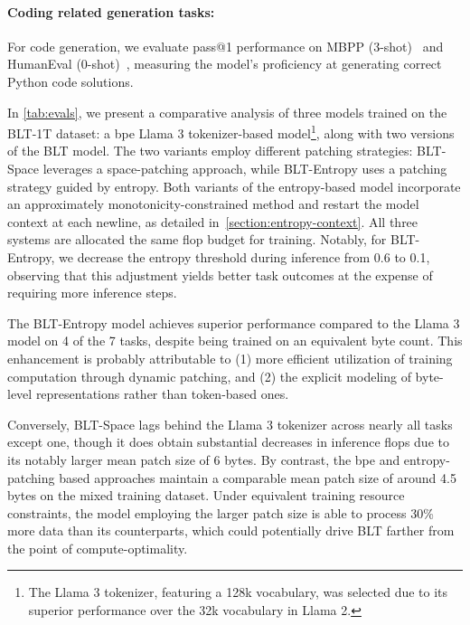 \paragraph{Coding related generation tasks:} For code generation, we evaluate pass@1 performance on MBPP (3-shot)~\citep{Eval_MBPP} and HumanEval (0-shot)~\citep{Eval_HumanEval}, measuring the model's proficiency at generating correct Python code solutions.

In \autoref{tab:evals}, we present a comparative analysis of three models trained on the {\textsc BLT}-1T dataset: a bpe Llama 3 tokenizer-based model\footnote{The Llama 3 tokenizer, featuring a 128k vocabulary, was selected due to its superior performance over the 32k vocabulary in Llama 2.}, along with two versions of the {\textsc BLT} model. The two variants employ different patching strategies: {\textsc BLT}-Space leverages a space-patching approach, while {\textsc BLT}-Entropy uses a patching strategy guided by entropy. Both variants of the entropy-based model incorporate an approximately monotonicity-constrained method and restart the model context at each newline, as detailed in~\autoref{section:entropy-context}. All three systems are allocated the same flop budget for training. Notably, for {\textsc BLT}-Entropy, we decrease the entropy threshold during inference from 0.6 to 0.1, observing that this adjustment yields better task outcomes at the expense of requiring more inference steps.

The {\textsc BLT}-Entropy model achieves superior performance compared to the Llama 3 model on 4 of the 7 tasks, despite being trained on an equivalent byte count. This enhancement is probably attributable to (1) more efficient utilization of training computation through dynamic patching, and (2) the explicit modeling of byte-level representations rather than token-based ones.

Conversely, {\textsc BLT}-Space lags behind the Llama 3 tokenizer across nearly all tasks except one, though it does obtain substantial decreases in inference flops due to its notably larger mean patch size of 6 bytes. By contrast, the bpe and entropy-patching based approaches maintain a comparable mean patch size of around 4.5 bytes on the mixed training dataset. Under equivalent training resource constraints, the model employing the larger patch size is able to process 30\% more data than its counterparts, which could potentially drive {\textsc BLT} farther from the point of compute-optimality.

